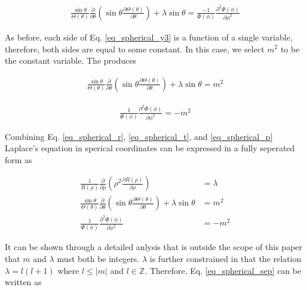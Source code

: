 \documentclass{article}
\numberwithin{equation}{subsection}
\begin{document}
\begin{equation}\label{eq_spherical_y3}
\begin{split}
\frac{\sin \theta}{\Theta(\theta)}
\frac{\partial}{\partial \theta}
\left( \sin \theta \frac{\partial \Theta(\theta)}{\partial \theta}\right) 
+ \lambda \sin \theta
 = \frac{-1}{\Phi(\phi)} 
\frac{\partial^2 \Phi(\phi)}{\partial \phi^2}
\end{split}
\end{equation}

As before, each side of Eq. \ref{eq_spherical_y3} is a function of a single variable, therefore, both sides are equal to some constant. In this case, we select $m^2$ to be  the constant variable. The produces

\begin{equation}\label{eq_spherical_t}
\begin{split}
\frac{\sin \theta}{\Theta(\theta)}
\frac{\partial}{\partial \theta}
\left( \sin \theta \frac{\partial \Theta(\theta)}{\partial \theta}\right) 
+ \lambda \sin \theta
 = m^2
\end{split}
\end{equation}

\begin{equation}\label{eq_spherical_p}
\begin{split}
\frac{1}{\Phi(\phi)} 
\frac{\partial^2 \Phi(\phi)}{\partial \phi^2} = -m^2
\end{split}
\end{equation}

Combining Eq. \ref{eq_spherical_r}, \ref{eq_spherical_t}, and \ref{eq_spherical_p} Laplace's equation in sperical coordinates can be expressed in a fully seperated form as

\begin{equation}\label{eq_spherical_sep}
\begin{split}
\frac{1}{R(\rho)}
\frac{\partial}{\partial \rho} 
\left( \rho^2 \frac{\partial R(\rho)}{\partial \rho}\right) 
&= \lambda \\
\frac{\sin \theta}{\Theta(\theta)}
\frac{\partial}{\partial \theta}
\left( \sin \theta \frac{\partial \Theta(\theta)}{\partial \theta}\right) 
+ \lambda \sin \theta
&= m^2 \\
\frac{1}{\Phi(\phi)} 
\frac{\partial^2 \Phi(\phi)}{\partial \phi^2}
&= -m^2
\end{split}
\end{equation}

It can be shown through a detailed anlysis that is outside the scope of this paper that $m$ and $\lambda$ must both be integers. $\lambda$ is further constrained in that the relation $\lambda = l(l+1)$ where $l \leq |m|$ and $l \in \mathbb{Z}$. Therefore, Eq. \ref{eq_spherical_sep} can be written as
\end{document}
